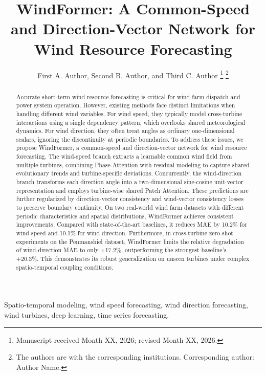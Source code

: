 \documentclass[journal,twoside,web]{ieeecolor}
\begin{document}
\title{WindFormer: A Common-Speed and Direction-Vector Network for Wind Resource Forecasting}

\author{First A. Author, Second B. Author, and Third C. Author
\thanks{Manuscript received Month XX, 2026; revised Month XX, 2026.}
\thanks{The authors are with the corresponding institutions. Corresponding author: Author Name.}}

\maketitle

\begin{abstract}
Accurate short-term wind resource forecasting is critical for wind farm dispatch and power system operation. However, existing methods face distinct limitations when handling different wind variables. For wind speed, they typically model cross-turbine interactions using a single dependency pattern, which overlooks shared meteorological dynamics. For wind direction, they often treat angles as ordinary one-dimensional scalars, ignoring the discontinuity at periodic boundaries. To address these issues, we propose WindFormer, a common-speed and direction-vector network for wind resource forecasting. The wind-speed branch extracts a learnable common wind field from multiple turbines, combining Phase-Attention with residual modeling to capture shared evolutionary trends and turbine-specific deviations. Concurrently, the wind-direction branch transforms each direction angle into a two-dimensional sine-cosine unit-vector representation and employs turbine-wise shared Patch Attention. These predictions are further regularized by direction-vector consistency and wind-vector consistency losses to preserve boundary continuity. On two real-world wind farm datasets with different periodic characteristics and spatial distributions, WindFormer achieves consistent improvements. Compared with state-of-the-art baselines, it reduces MAE by 10.2\% for wind speed and 10.1\% for wind direction. Furthermore, in cross-turbine zero-shot experiments on the Penmanshiel dataset, WindFormer limits the relative degradation of wind-direction MAE to only +17.2\%, outperforming the strongest baseline's +20.3\%. This demonstrates its robust generalization on unseen turbines under complex spatio-temporal coupling conditions.
\end{abstract}

\begin{IEEEkeywords}
Spatio-temporal modeling, wind speed forecasting, wind direction forecasting, wind turbines, deep learning, time series forecasting.
\end{IEEEkeywords}
\end{document}
